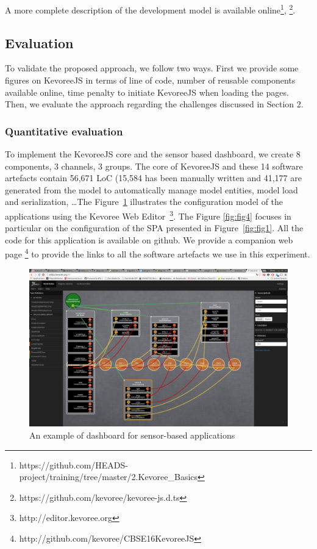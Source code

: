  A more complete description of the development model is available online\footnote{ https://github.com/HEADS-project/training/tree/master/2.Kevoree\_Basics}, \footnote{https://github.com/kevoree/kevoree-js.d.ts}.

\subsection{Evaluation}
To validate the proposed approach, we follow two ways. First we provide some figures on KevoreeJS in terms of line of code, number of reusable components available online, time penalty to initiate KevoreeJS when loading the pages. Then, we evaluate the approach regarding the challenges discussed in Section 2.

\subsubsection{Quantitative evaluation}
To implement the KevoreeJS core and the sensor based dashboard, we create 8 components, 3 channels, 3 groups. The core of KevoreeJS and these 14 software artefacts contain 56,671 LoC (15,584 has been manually written and 41,177 are generated from the model to automatically manage model entities, model load and serialization, \dots The Figure~\ref{fig:fig3}  illustrates the configuration model of the applications using the Kevoree Web Editor~\footnote{http://editor.kevoree.org}. The Figure \ref{fig:fig4} focuses in particular on the configuration of the SPA presented in Figure~\ref{fig:fig1}. All the code for this application is available on github. We provide a companion web page \footnote{http://github.com/kevoree/CBSE16KevoreeJS} to provide the links to all the software artefacts we use in this experiment.


\begin{figure}[t]
	\centering
	\includegraphics[width=1\linewidth]{figures/fig1}
	\caption{An example of dashboard for sensor-based applications}
	\label{fig:fig3}
\end{figure}


